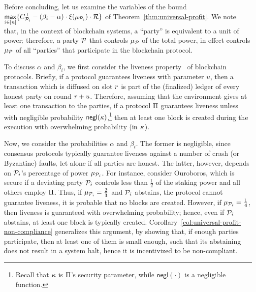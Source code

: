 Before concluding, let us examine the variables of the bound
$\underset{i \in [n]}{\mathsf{max}}\{ C^\bot_{\mathcal{P}_i} - (\beta_i - \alpha) \cdot \xi(\mu_{\mathcal{P}_i}) \cdot \mathcal{R} \}$
of Theorem~\ref{thm:universal-profit}. We note that, in the context of
blockchain systems, a ``party'' is equivalent to a unit of power; therefore, a
party $\mathcal{P}$ that controls $\mu_{\mathcal{P}}$ of the total power, in
effect controls $\mu_{\mathcal{P}}$ of all ``parties'' that participate in
the blockchain protocol.

To discuss $\alpha$ and $\beta_i$, we first consider the liveness
property~\cite{RSA:GarKia20} of blockchain protocols. Briefly, if a protocol
guarantees liveness with parameter $u$, then a transaction which is diffused on
slot $r$ is part of the (finalized) ledger of every honest party on round
$r + u$. Therefore, assuming that the environment gives at least one
transaction to the parties, if a protocol $\Pi$ guarantees liveness unless
with negligible probability $\mathsf{negl}(\kappa)$,\footnote{Recall that $\kappa$ is
$\Pi$'s security parameter, while $\mathsf{negl}(\cdot)$ is a negligible function.}
then at least one block is created during the execution with overwhelming
probability (in $\kappa$).

Now, we consider the probabilities $\alpha$ and  $\beta_i$.  The former is
negligible, since consensus protocols typically guarantee liveness against a
number of crash (or Byzantine) faults, let alone if all parties are honest. The
latter, however, depends on $\mathcal{P}_i$'s percentage of power
$\mu_{\mathcal{P}_i}$. For instance, consider Ouroboros, which is secure if
a deviating party $\mathcal{P}_i$ controls less than $\frac{1}{2}$ of the staking
power and all others employ $\Pi$. Thus, if $\mu_{\mathcal{P}_i} =
\frac{2}{3}$ and $\mathcal{P}_i$ abstains, the protocol cannot guarantee liveness,
\ie it is probable that no blocks are created. However, if
$\mu_{\mathcal{P}_i} = \frac{1}{4}$, then liveness is guaranteed with
overwhelming probability; hence, even if $\mathcal{P}_i$ abstains, at least one
block is typically created.
Corollary~\ref{col:universal-profit-non-compliance} generalizes this argument,
by showing that, if enough parties participate, then at least one of them is
small enough, such that its abstaining does not result in a system halt, hence
it is incentivized to be non-compliant.

